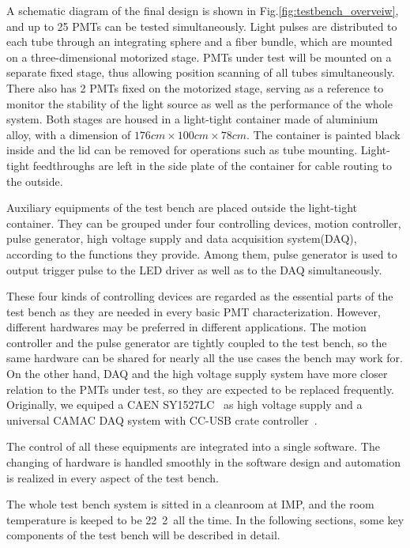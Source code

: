 \documentclass[5p, times]{elsarticle}
\begin{document}
A schematic diagram of the final design is shown in Fig.\ref{fig:testbench_overveiw}, and up to 25 PMTs can be tested simultaneously.
Light pulses are distributed to each tube through an integrating sphere and a fiber bundle, which are mounted on a three-dimensional motorized stage.
PMTs under test will be mounted on a separate fixed stage, thus allowing position scanning of all tubes simultaneously.
There also has 2 PMTs fixed on the motorized stage, serving as a reference to monitor the stability of the light source as well as the performance of the whole system.
Both stages are housed in a light-tight container made of aluminium alloy, with a dimension of $176cm\times100cm\times78cm$.
The container is painted black inside and the lid can be removed for operations such as tube mounting.
Light-tight feedthroughs are left in the side plate of the container for cable routing to the outside.

Auxiliary equipments of the test bench are placed outside the light-tight container.
They can be grouped under four controlling devices, motion controller, pulse generator, high voltage supply and data acquisition system(DAQ), according to the functions they provide.
Among them, pulse generator is used to output trigger pulse to the LED driver as well as to the DAQ simultaneously.

These four kinds of controlling devices are regarded as the essential parts of the test bench as they are needed in every basic PMT characterization.
However, different hardwares may be preferred in different applications.
The motion controller and the pulse generator are tightly coupled to the test bench, so the same hardware can be shared for nearly all the use cases the bench may work for. 
On the other hand, DAQ and the high voltage supply system have more closer relation to the PMTs under test, so they are expected to be replaced frequently. 
Originally, we equiped a CAEN SY1527LC~\cite{sy1527lc} as high voltage supply and a universal CAMAC DAQ system with CC-USB crate controller~\cite{cc_usb}.

The control of all these equipments are integrated into a single software. 
The changing of hardware is handled smoothly in the software design and automation is realized in every aspect of the test bench.

The whole test bench system is sitted in a cleanroom at IMP, and the room temperature is keeped to be 22\textpm~2\textcelsius~all the time.
In the following sections, some key components of the test bench will be described in detail.
\end{document}
